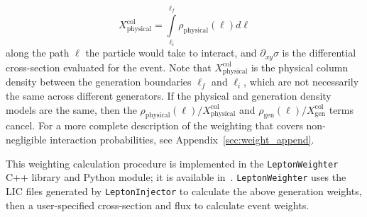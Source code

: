 \documentclass[main.tex]{subfiles}
\newcommand{\LeptonInjector}{\texttt{LeptonInjector}}
\newcommand{\LeptonWeighter}{\texttt{LeptonWeighter}}
\begin{document}
\begin{equation}
X_\textrm{physical}^\textrm{col} = \int\limits_{\ell_{i}}^{\ell_{f}}\rho_\textrm{physical}(\ell) d\ell
\end{equation}
along the path $\ell$ the particle would take to interact, and $\partial_{xy}\sigma$ is the differential cross-section evaluated for the event.
Note that $X_\textrm{physical}^\textrm{col}$ is the physical column density between the generation boundaries $\ell_f$ and $\ell_i$, which are not necessarily the same across different generators.
If the physical and generation density models are the same, then the ${\rho_\textrm{physical}(\ell)}/{X_\textrm{physical}^\textrm{col}}$ and ${\rho_\textrm{gen}(\ell)}/{X_\textrm{gen}^\textrm{col}}$ terms cancel.
For a more complete description of the weighting that covers non-negligible interaction probabilities, see Appendix~\ref{sec:weight_append}.


This weighting calculation procedure is implemented in the \LeptonWeighter{} {\ttf C++} library and Python module; it is available in~\cite{LeptonWeighterRepository}.
\LeptonWeighter{} uses the LIC files generated by \LeptonInjector{} to calculate the above generation weights, then a user-specified cross-section and flux to calculate event weights.
\end{document}
